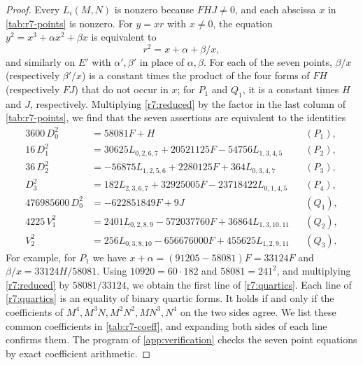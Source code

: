 \begin{proof}
Every $L_i(M,N)$ is nonzero because $FHJ\ne0$, and each abscissa $x$ in
\cref{tab:r7-points} is nonzero. For $y=xr$ with $x\ne0$, the equation
$y^2=x^3+\alpha x^2+\beta x$ is equivalent to
\begin{equation}\label{r7:reduced}
 r^2=x+\alpha+\beta/x,
\end{equation}
and similarly on $E'$ with $\alpha',\beta'$ in place of $\alpha,\beta$. For
each of the seven points, $\beta/x$ (respectively $\beta'/x$) is a constant
times the product of the four forms of $FH$ (respectively $FJ$) that do not
occur in $x$; for $P_1$ and $Q_1$, it is a constant times $H$ and $J$,
respectively.
Multiplying \eqref{r7:reduced} by the factor in the last column of
\cref{tab:r7-points}, we find that the seven assertions are equivalent to
the identities
\begin{equation}\label{r7:quartics}
\begin{aligned}
 3600\,D_0^2&=58081F+H &&(P_1),\\
 16\,D_1^2&=30625L_{0,2,6,7}+20521125F-54756L_{1,3,4,5} &&(P_2),\\
 36\,D_2^2&=-56875L_{1,2,5,6}+2280125F+364L_{0,3,4,7} &&(P_3),\\
 D_3^2&=182L_{2,3,6,7}+32925005F-23718422L_{0,1,4,5} &&(P_4),\\
 476985600\,D_0^2&=-622851849F+9J &&(Q_1),\\
 4225\,V_1^2&=2401L_{0,2,8,9}-572037760F+36864L_{1,3,10,11} &&(Q_2),\\
 V_2^2&=256L_{0,3,8,10}-656676000F+455625L_{1,2,9,11} &&(Q_3).
\end{aligned}
\end{equation}
For example, for $P_1$ we have $x+\alpha=(91205-58081)F=33124F$ and
$\beta/x=33124H/58081$. Using $10920=60\cdot182$ and $58081=241^2$, and
multiplying \eqref{r7:reduced} by $58081/33124$, we obtain the first line
of \eqref{r7:quartics}. Each line of \eqref{r7:quartics} is an equality of
binary quartic forms. It holds if and only if the coefficients of
$M^4,M^3N,M^2N^2,MN^3,N^4$ on the two sides agree. We list these common
coefficients in \cref{tab:r7-coeff}, and expanding both sides of each line
confirms them. The program of \cref{app:verification} checks the
seven point equations by exact coefficient arithmetic.
\end{proof}

